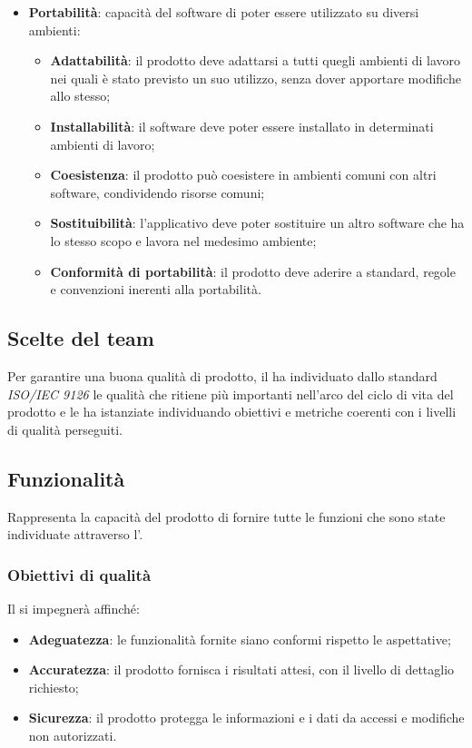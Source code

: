 \begin{itemize}
	\item\textbf{Portabilità}: capacità del software di poter essere utilizzato su diversi ambienti:
	\begin{itemize}
		\item\textbf{Adattabilità}: il prodotto deve adattarsi a tutti quegli ambienti di lavoro nei quali è stato previsto un suo utilizzo, senza dover apportare modifiche allo stesso;
		\item\textbf{Installabilità}: il software deve poter essere installato in determinati ambienti di lavoro;
		\item\textbf{Coesistenza}: il prodotto può coesistere in ambienti comuni
con altri software, condividendo risorse comuni;
		\item\textbf{Sostituibilità}: l'applicativo deve poter sostituire un altro software che ha lo stesso scopo e lavora nel medesimo ambiente;
		\item\textbf{Conformità di portabilità}: il prodotto deve aderire a standard, regole e convenzioni inerenti alla portabilità.
	\end{itemize}
\end{itemize}

\subsection{Scelte del team}
Per garantire una buona qualità di prodotto, il  ha individuato dallo standard \textit{ISO/IEC 9126} le qualità che ritiene più importanti nell'arco del ciclo di vita del prodotto e le ha istanziate individuando obiettivi e metriche coerenti con i livelli di qualità perseguiti.

\subsection{Funzionalità}
Rappresenta la capacità del prodotto di fornire tutte le funzioni che sono state individuate attraverso l'\AdR.

\subsubsection{Obiettivi di qualità}
Il  si impegnerà affinché:
\begin{itemize}
\item \textbf{Adeguatezza}: le funzionalità fornite siano conformi rispetto le aspettative;
\item \textbf{Accuratezza}: il prodotto fornisca i risultati attesi, con il livello di dettaglio richiesto;
\item \textbf{Sicurezza}: il prodotto protegga le informazioni e i dati da accessi e modifiche non autorizzati.
\end{itemize}

